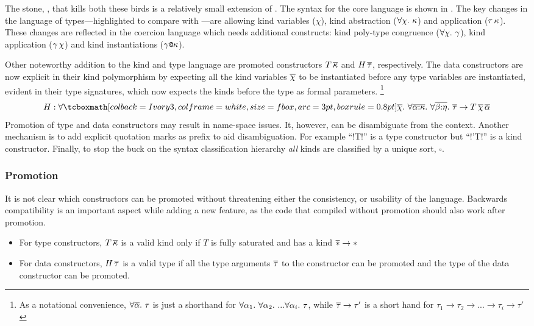 \documentclass[manuscript,screen,nonacm]{acmart}
\begin{document}
The stone, \SFP, that kills both these birds is a relatively small extension of \SF. The syntax for the core language is shown in . The key changes in the language of types---highlighted to compare with \SFC---are allowing kind variables ($\chi$), kind abstraction ($\forall\chi.~\kappa$) and application ($\tau\, \kappa$). These changes are reflected in the coercion language which needs additional constructs: kind poly-type congruence ($\forall\chi.~\gamma$), kind application ($\gamma\,\chi$) and kind instantiations ($\gamma\texttt{@}\kappa$).

Other noteworthy addition to the kind and type language are promoted constructors $T\,\overline{\kappa}$ and $H\,\overline{\tau}$, respectively. The data constructors are now explicit in their kind polymorphism by expecting all the kind variables $\overline{\chi}$ to be instantiated before any type variables are instantiated, evident in their type signatures, which now expects the kinds before the type as formal parameters.
\footnote{As a notational convenience, $\forall\overline{\alpha}.~\tau$ is just a shorthand for $\forall\alpha_1.~\forall\alpha_2.~... \forall\alpha_i.~\tau$, while $\overline{\tau} \to \tau'$ is a short hand for $\tau_1 \to \tau_2 \to ... \to \tau_i \to \tau'$
}{$$ H : \Forall {\shl{\many\chi}} {\Forall {\many{\TyVar\co\kappa}} {\Forall {\many{\beta\co\eta}} {\many\tau \to T \App\many{\chi}\App\many{\TyVar}}}} $$
}
Promotion of type and data constructors may result in name-space issues. It, however, can be disambiguate from the context. Another mechanism is to add explicit quotation marks as prefix to aid disambiguation.
For example ``!T!'' is a type constructor but ``!'T!'' is a kind constructor.
Finally, to stop the buck on the syntax classification hierarchy \emph{all} kinds are classified by a unique sort, $\square$.

\subsubsection{Promotion}
It is not clear which constructors can be promoted without threatening either the consistency, or usability of the language. Backwards compatibility is an important aspect while adding a new feature, as the code that compiled without promotion should also work after promotion.

\begin{itemize}
\item For type constructors, $T\,\overline{\kappa}$ is a valid kind only if $T$ is fully saturated and has a kind $\overline{\ast} \to \ast$
\item For data constructors, $H\,\overline{\tau}$ is a valid type if all the type arguments $\overline{\tau}$ to the constructor can be promoted and the type of the data constructor can be promoted.
\end{itemize}
\end{document}
